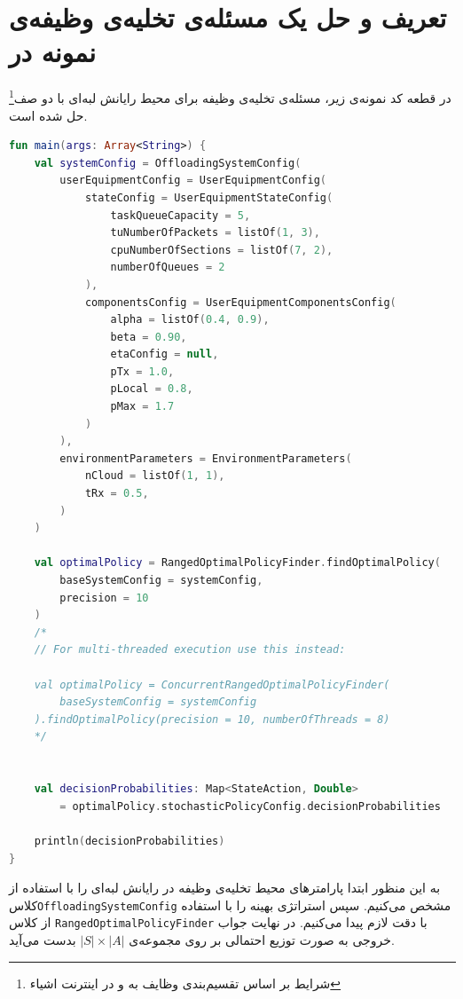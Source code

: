 \section{تعریف و حل یک مسئله‌ی تخلیه‌ی وظیفه‌ی نمونه در }
در قطعه کد نمونه‌ی زیر، مسئله‌ی تخلیه‌ی وظیفه‌ برای محیط رایانش لبه‌ای با دو صف\footnote{شرایط بر اساس تقسیم‌بندی وظایف به  و  در اینترنت اشیاء} حل شده است.
\begin{LTR}
	\begin{lstlisting}[language=Kotlin, caption={تعریف و حل مسئله‌ی نمونه}, captiondirection=RTL, label={lst:solve}]
fun main(args: Array<String>) {
	val systemConfig = OffloadingSystemConfig(
		userEquipmentConfig = UserEquipmentConfig(
			stateConfig = UserEquipmentStateConfig(
				taskQueueCapacity = 5,
				tuNumberOfPackets = listOf(1, 3),
				cpuNumberOfSections = listOf(7, 2),
				numberOfQueues = 2
			),
			componentsConfig = UserEquipmentComponentsConfig(
				alpha = listOf(0.4, 0.9),
				beta = 0.90,
				etaConfig = null,
				pTx = 1.0,
				pLocal = 0.8,
				pMax = 1.7
			)
		),
		environmentParameters = EnvironmentParameters(
			nCloud = listOf(1, 1),
			tRx = 0.5,
		)
	)
	
	val optimalPolicy = RangedOptimalPolicyFinder.findOptimalPolicy(
		baseSystemConfig = systemConfig, 
		precision = 10
	)
	/*
	// For multi-threaded execution use this instead:
	
	val optimalPolicy = ConcurrentRangedOptimalPolicyFinder(
		baseSystemConfig = systemConfig
	).findOptimalPolicy(precision = 10, numberOfThreads = 8)
	*/
	
	
	val decisionProbabilities: Map<StateAction, Double>
		= optimalPolicy.stochasticPolicyConfig.decisionProbabilities
	
	println(decisionProbabilities)
}
	\end{lstlisting}
\end{LTR}
به این منظور ابتدا پارامترهای محیط تخلیه‌ی وظیفه در رایانش لبه‌ای را با استفاده از کلاس\linebreak \texttt{\footnotesize OffloadingSystemConfig} مشخص می‌کنیم. سپس استراتژی بهینه را با استفاده از کلاس \texttt{\footnotesize RangedOptimalPolicyFinder} با دقت لازم پیدا می‌کنیم. در نهایت جواب خروجی به صورت توزیع احتمالی بر روی مجموعه‌ی $|S| \times |A|$ بدست می‌آید.
\newpage
